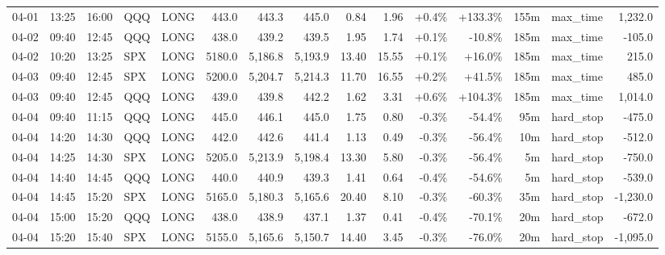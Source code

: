 \documentclass[11pt,a4paper,twoside]{article}
\begin{document}
\begin{landscape}
\begin{center}
\begin{longtable}{>{\color{txtmain}}l l l l l r r r r r r r r >{\color{txtmain}}l r}
04-01 & 13:25 & 16:00 & QQQ & LONG & 443.0 & 443.3 & 445.0 & 0.84 & 1.96 & \textcolor{wingreen}{+0.4\%} & \textcolor{wingreen}{+133.3\%} & 155m & max\_time & \textcolor{wingreen}{1,232.0} \\
04-02 & 09:40 & 12:45 & QQQ & LONG & 438.0 & 439.2 & 439.5 & 1.95 & 1.74 & \textcolor{wingreen}{+0.1\%} & \textcolor{lossred}{-10.8\%} & 185m & max\_time & \textcolor{lossred}{-105.0} \\
04-02 & 10:20 & 13:25 & SPX & LONG & 5180.0 & 5,186.8 & 5,193.9 & 13.40 & 15.55 & \textcolor{wingreen}{+0.1\%} & \textcolor{wingreen}{+16.0\%} & 185m & max\_time & \textcolor{wingreen}{215.0} \\
04-03 & 09:40 & 12:45 & SPX & LONG & 5200.0 & 5,204.7 & 5,214.3 & 11.70 & 16.55 & \textcolor{wingreen}{+0.2\%} & \textcolor{wingreen}{+41.5\%} & 185m & max\_time & \textcolor{wingreen}{485.0} \\
04-03 & 09:40 & 12:45 & QQQ & LONG & 439.0 & 439.8 & 442.2 & 1.62 & 3.31 & \textcolor{wingreen}{+0.6\%} & \textcolor{wingreen}{+104.3\%} & 185m & max\_time & \textcolor{wingreen}{1,014.0} \\
04-04 & 09:40 & 11:15 & QQQ & LONG & 445.0 & 446.1 & 445.0 & 1.75 & 0.80 & \textcolor{lossred}{-0.3\%} & \textcolor{lossred}{-54.4\%} & 95m & hard\_stop & \textcolor{lossred}{-475.0} \\
04-04 & 14:20 & 14:30 & QQQ & LONG & 442.0 & 442.6 & 441.4 & 1.13 & 0.49 & \textcolor{lossred}{-0.3\%} & \textcolor{lossred}{-56.4\%} & 10m & hard\_stop & \textcolor{lossred}{-512.0} \\
04-04 & 14:25 & 14:30 & SPX & LONG & 5205.0 & 5,213.9 & 5,198.4 & 13.30 & 5.80 & \textcolor{lossred}{-0.3\%} & \textcolor{lossred}{-56.4\%} & 5m & hard\_stop & \textcolor{lossred}{-750.0} \\
04-04 & 14:40 & 14:45 & QQQ & LONG & 440.0 & 440.9 & 439.3 & 1.41 & 0.64 & \textcolor{lossred}{-0.4\%} & \textcolor{lossred}{-54.6\%} & 5m & hard\_stop & \textcolor{lossred}{-539.0} \\
04-04 & 14:45 & 15:20 & SPX & LONG & 5165.0 & 5,180.3 & 5,165.6 & 20.40 & 8.10 & \textcolor{lossred}{-0.3\%} & \textcolor{lossred}{-60.3\%} & 35m & hard\_stop & \textcolor{lossred}{-1,230.0} \\
04-04 & 15:00 & 15:20 & QQQ & LONG & 438.0 & 438.9 & 437.1 & 1.37 & 0.41 & \textcolor{lossred}{-0.4\%} & \textcolor{lossred}{-70.1\%} & 20m & hard\_stop & \textcolor{lossred}{-672.0} \\
04-04 & 15:20 & 15:40 & SPX & LONG & 5155.0 & 5,165.6 & 5,150.7 & 14.40 & 3.45 & \textcolor{lossred}{-0.3\%} & \textcolor{lossred}{-76.0\%} & 20m & hard\_stop & \textcolor{lossred}{-1,095.0} \\

\end{longtable}
\end{center}
\end{landscape}
\end{document}

